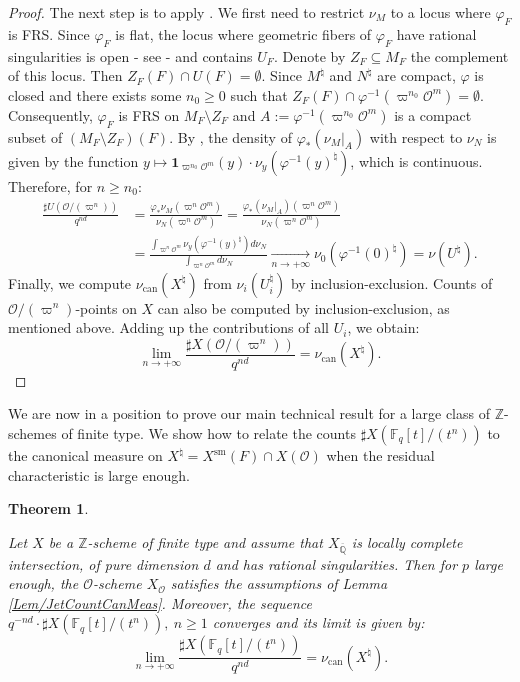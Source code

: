 \documentclass[11pt,english]{article}
\numberwithin{equation}{section}
\numberwithin{figure}{section}
\theoremstyle{definition}
\theoremstyle{plain}
\newtheorem{thm}[df]{Theorem}
\theoremstyle{remark}
\begin{document}
\begin{proof}
The next step is to apply \cite[Thm. 3.16.]{AA16}. We first need
to restrict $\nu_{M}$ to a locus where $\varphi_{F}$ is FRS. Since
$\varphi_{F}$ is flat, the locus where geometric fibers of $\varphi_{F}$
have rational singularities is open - see  \cite[Thm. 4]{Elk78} -
and contains $U_{F}$. Denote by $Z_{F}\subseteq M_{F}$ the complement
of this locus. Then $Z_{F}(F)\cap U(F)=\emptyset$. Since $M^{\natural}$
and $N^{\natural}$ are compact, $\varphi$ is closed and there exists
some $n_{0}\geq0$ such that $Z_{F}(F)\cap\varphi^{-1}(\varpi^{n_{0}}\mathcal{O}^{m})=\emptyset$.
Consequently, $\varphi_{F}$ is FRS on $M_{F}\setminus Z_{F}$ and
$A:=\varphi^{-1}(\varpi^{n_{0}}\mathcal{O}^{m})$ is a compact subset
of $(M_{F}\setminus Z_{F})(F)$. By \cite[Thm. 3.16.]{AA16}, the
density of $\varphi_{*}\left(\nu_{M}\vert_{A}\right)$ with respect
to $\nu_{N}$ is given by the function $y\mapsto\mathbf{1}_{\varpi^{n_{0}}\mathcal{O}^{m}}(y)\cdot\nu_{y}(\varphi^{-1}(y)^{\natural})$,
which is continuous. Therefore, for $n\geq n_{0}$:\begin{align*}
\frac{\sharp U(\mathcal{O}/(\varpi^n))}{q^{nd}}
&=
\frac{\varphi_*\nu_M(\varpi^n\mathcal{O}^m)}{\nu_N(\varpi^n\mathcal{O}^m)}
=
\frac{\varphi_*\left(\nu_M\vert_{A}\right)(\varpi^n\mathcal{O}^m)}{\nu_N(\varpi^n\mathcal{O}^m)} \\
&=
\frac{\int_{\varpi^n\mathcal{O}^m}\nu_{y}(\varphi^{-1}(y)^{\natural})d\nu_N}{\int_{\varpi^n\mathcal{O}^m}d\nu_N}
\underset{n\rightarrow+\infty}{\longrightarrow}
\nu_0(\varphi^{-1}(0)^{\natural})=\nu(U^{\natural}).
\end{align*}Finally, we compute $\nu_{\mathrm{can}}(X^{\natural})$ from $\nu_{i}(U_{i}^{\natural})$
by inclusion-exclusion. Counts of $\mathcal{O}/(\varpi^{n})$-points
on $X$ can also be computed by inclusion-exclusion, as mentioned
above. Adding up the contributions of all $U_{i}$, we obtain:\[
\underset{n\rightarrow +\infty}{\lim}\frac{\sharp X(\mathcal{O}/(\varpi^{n}))}{q^{nd}}
=
\nu_{\mathrm{can}}(X^{\natural}).
\]\end{proof}

We are now in a position to prove our main technical result for a
large class of $\mathbb{Z}$-schemes of finite type. We show how to
relate the counts $\sharp X(\mathbb{F}_{q}[t]/(t^{n}))$ to the canonical
measure on $X^{\natural}=X^{\mathrm{sm}}(F)\cap X(\mathcal{O})$ when
the residual characteristic is large enough.

\begin{thm} \label{Thm/JetCountCanMeas}

Let $X$ be a $\mathbb{Z}$-scheme of finite type and assume that
$X_{\overline{\mathbb{Q}}}$ is locally complete intersection, of
pure dimension $d$ and has rational singularities. Then for $p$
large enough, the $\mathcal{O}$-scheme $X_{\mathcal{O}}$ satisfies
the assumptions of Lemma \ref{Lem/JetCountCanMeas}. Moreover, the
sequence $q^{-nd}\cdot\sharp X(\mathbb{F}_{q}[t]/(t^{n})),\ n\geq1$
converges and its limit is given by:\[
\underset{n\rightarrow +\infty}{\lim}\frac{\sharp X(\mathbb{F}_{q}[t]/(t^{n}))}{q^{nd}}
=
\nu_{\mathrm{can}}(X^{\natural}).
\]\end{thm}
\end{document}
